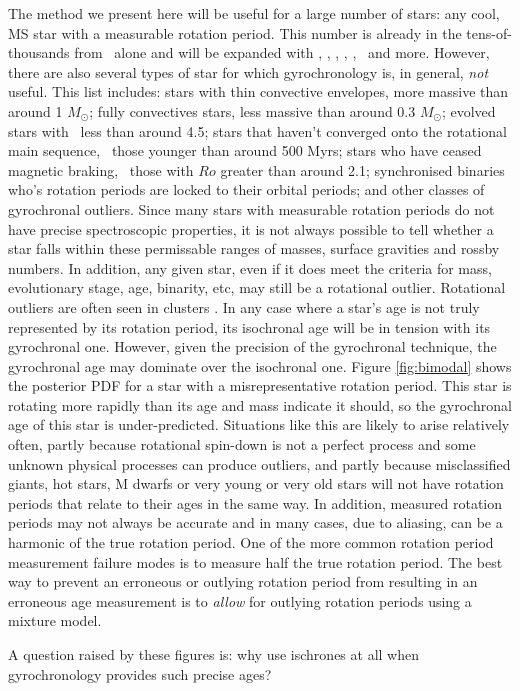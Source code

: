 The method we present here will be useful for a large number of stars: any
cool, MS star with a measurable rotation period.
This number is already in the tens-of-thousands from \kepler\ alone and will
be expanded with \tess, \lsst, \wfirst, \plato, \gaia, \panstarrs\ and more.
However, there are also several types of star for which gyrochronology is, in
general, {\it not} useful.
This list includes: stars with thin convective envelopes, more massive than
around 1 $M_\odot$; fully convectives stars, less massive than around 0.3
$M_\odot$; evolved stars with \logg\ less than around 4.5; stars that haven't
converged onto the rotational main sequence, \ie\ those younger than around
500 Myrs; stars who have ceased magnetic braking, \ie\ those with $Ro$ greater
than around 2.1; synchronised binaries who's rotation periods are locked to
their orbital periods; and other classes of gyrochronal outliers.
Since many stars with measurable rotation periods do not have precise
spectroscopic properties, it is not always possible to tell whether a star
falls within these permissable ranges of masses, surface gravities and rossby
numbers.
In addition, any given star, even if it does meet the criteria for mass,
evolutionary stage, age, binarity, etc, may still be a rotational outlier.
Rotational outliers are often seen in clusters \citep[see \eg][]{douglas}.
In any case where a star's age is not truly represented by its rotation
period, its isochronal age will be in tension with its gyrochronal one.
However, given the precision of the gyrochronal technique, the gyrochronal
age may dominate over the isochronal one.
Figure \ref{fig:bimodal} shows the posterior PDF for a star with a
misrepresentative rotation period.
This star is rotating more rapidly than its age and mass indicate it should,
so the gyrochronal age of this star is under-predicted.
Situations like this are likely to arise relatively often, partly because
rotational spin-down is not a perfect process and some unknown physical
processes can produce outliers, and partly because misclassified giants, hot
stars, M dwarfs or very young or very old stars will not have rotation periods
that relate to their ages in the same way.
In addition, measured rotation periods may not always be accurate and in many
cases, due to aliasing, can be a harmonic of the true rotation period.
One of the more common rotation period measurement failure modes is to measure
half the true rotation period.
The best way to prevent an erroneous or outlying rotation period from
resulting in an erroneous age measurement is to {\it allow} for outlying
rotation periods using a mixture model.

A question raised by these figures is: why use ischrones at all when
gyrochronology provides such precise ages?
